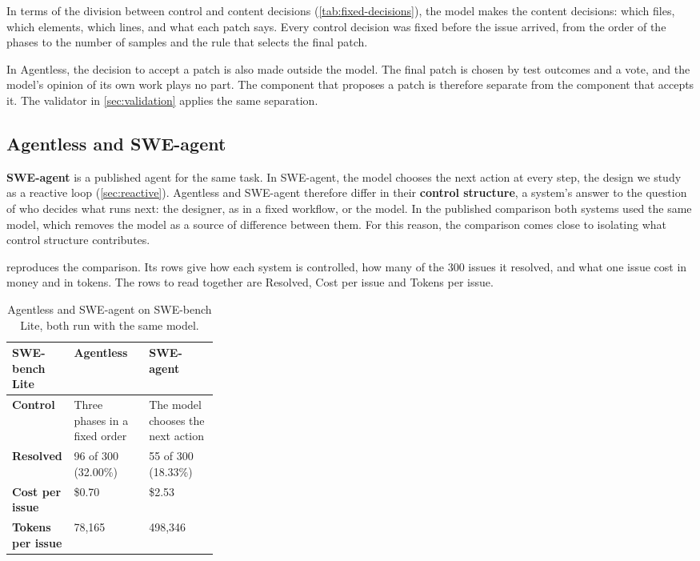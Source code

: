 In terms of the division between control and content decisions (\cref{tab:fixed-decisions}), the
model makes the content decisions: which files, which elements, which lines, and what each patch
says. Every control decision was fixed before the issue arrived, from the order of the phases to the
number of samples and the rule that selects the final patch.

In Agentless, the decision to accept a patch is also made outside the model. The final patch is
chosen by test outcomes and a vote, and the model's opinion of its own work plays no part. The
component that proposes a patch is therefore separate from the component that accepts it. The
validator in \cref{sec:validation} applies the same separation.

\subsection{Agentless and SWE-agent}
\label{sec:fixed-comparison}

\textbf{SWE-agent} is a published agent for the same task. In SWE-agent, the model chooses the next
action at every step, the design we study as a reactive loop (\cref{sec:reactive}). Agentless and
SWE-agent therefore differ in their \textbf{control structure}, a system's answer to the question of
who decides what runs next: the designer, as in a fixed workflow, or the model. In the published
comparison both systems used the same model, which removes the model as a source of difference
between them. For this reason, the comparison comes close to isolating what control structure
contributes.

 reproduces the comparison. Its rows give how each system is controlled,
how many of the 300 issues it resolved, and what one issue cost in money and in tokens. The rows to
read together are Resolved, Cost per issue and Tokens per issue.

\begin{table}[htbp]
  \caption{Agentless and SWE-agent on SWE-bench Lite, both run with the same model.}
  \label{tab:fixed-comparison}
  \begin{adjustbox}{width=\linewidth}\begin{tabularx}{\linewidth}{L{0.3\linewidth}XX}
    \toprule
    \textbf{SWE-bench Lite} & \textbf{Agentless} & \textbf{SWE-agent} \\
    \midrule
    \textbf{Control} & Three phases in a fixed order & The model chooses the next action \\
    \textbf{Resolved} & 96 of 300 (32.00\%) & 55 of 300 (18.33\%) \\
    \textbf{Cost per issue} & \$0.70 & \$2.53 \\
    \textbf{Tokens per issue} & 78,165 & 498,346 \\
    \bottomrule
  \end{tabularx}\end{adjustbox}
\end{table}

